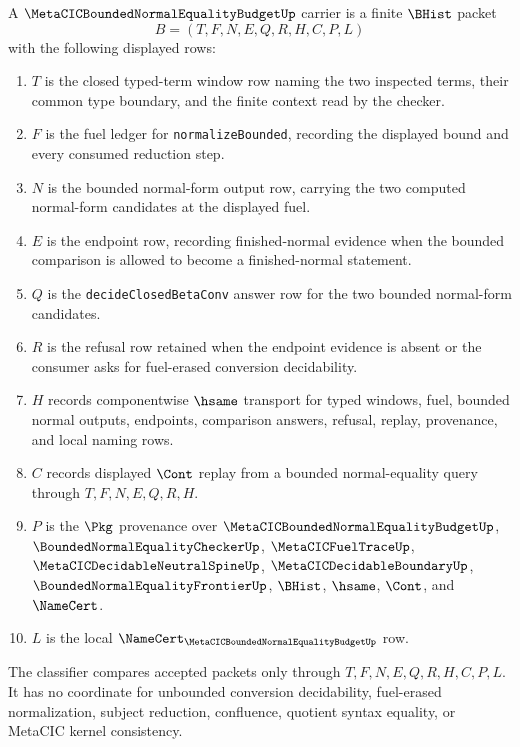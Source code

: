 \begin{definition}
\label{def:metacic-bounded-normal-equality-budget-carrier}
A $\MetaCICBoundedNormalEqualityBudgetUp$ carrier is a finite $\BHist$ packet
$$
B=(T,F,N,E,Q,R,H,C,P,L)
$$
with the following displayed rows:
\begin{enumerate}
\item $T$ is the closed typed-term window row naming the two inspected terms, their common type boundary, and the finite context read by the checker.
\item $F$ is the fuel ledger for \texttt{normalizeBounded}, recording the displayed bound and every consumed reduction step.
\item $N$ is the bounded normal-form output row, carrying the two computed normal-form candidates at the displayed fuel.
\item $E$ is the endpoint row, recording finished-normal evidence when the bounded comparison is allowed to become a finished-normal statement.
\item $Q$ is the \texttt{decideClosedBetaConv} answer row for the two bounded normal-form candidates.
\item $R$ is the refusal row retained when the endpoint evidence is absent or the consumer asks for fuel-erased conversion decidability.
\item $H$ records componentwise $\hsame$ transport for typed windows, fuel, bounded normal outputs, endpoints, comparison answers, refusal, replay, provenance, and local naming rows.
\item $C$ records displayed $\Cont$ replay from a bounded normal-equality query through $T,F,N,E,Q,R,H$.
\item $P$ is the $\Pkg$ provenance over $\MetaCICBoundedNormalEqualityBudgetUp$, $\BoundedNormalEqualityCheckerUp$, $\MetaCICFuelTraceUp$, $\MetaCICDecidableNeutralSpineUp$, $\MetaCICDecidableBoundaryUp$, $\BoundedNormalEqualityFrontierUp$, $\BHist$, $\hsame$, $\Cont$, and $\NameCert$.
\item $L$ is the local $\NameCert_{\MetaCICBoundedNormalEqualityBudgetUp}$ row.
\end{enumerate}
The classifier compares accepted packets only through $T,F,N,E,Q,R,H,C,P,L$. It has no coordinate for unbounded conversion decidability, fuel-erased normalization, subject reduction, confluence, quotient syntax equality, or MetaCIC kernel consistency.
\end{definition}

